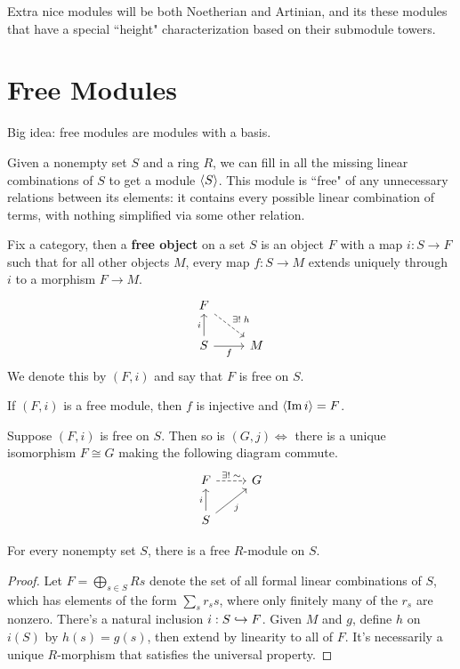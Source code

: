 \documentclass[twoside,10pt]{report}
\begin{document}
Extra nice modules will be both Noetherian and Artinian, and its these modules that have a special ``height" characterization based on their submodule towers.


\section{Free Modules}

\begin{note}[]
Big idea: free modules are modules with a basis.
\end{note}

Given a nonempty set $S$ and a ring $R$, we can fill in all the missing linear combinations of $S$ to get a module $\langle S \rangle$. This module is ``free" of any unnecessary relations between its elements: it contains every possible linear combination of terms, with nothing simplified via some other relation.

\begin{defn}[]
Fix a category, then a \textbf{free object} on a set $S$ is an object $F$ with a map $i:S\to F$ such that for all other objects $M$, every map $f:S\to M$ extends uniquely through $i$ to a morphism $F\to M$.
\[
\begin{tikzcd}
	F \arrow[dr, dashed, "\exists! \; h"] \\
	S \uar{i}\rar["f"'] & M
\end{tikzcd}
\] 
We denote this by $(F, i)$ and say that $F$ is free on $S$.
\end{defn}

\begin{prop}
	If $(F,i)$ is a free module, then $f$ is injective and $\langle \operatorname{Im} i \rangle= F$.
\end{prop}

\begin{thrm}[Uniqueness]
	\label{thrm:free-unique}
	Suppose $(F,i)$ is free on $S$. Then so is $(G,j) \iff$ there is a unique isomorphism $F \cong G$ making the following diagram commute.
	\[
	\begin{tikzcd}
		F \rar[dashed]{\exists!\;\sim} & G \\
		S \uar{i}\arrow[ur,"j"']
	\end{tikzcd}
	\] 
\end{thrm}

\begin{thrm}[Existence]
	For every nonempty set $S$, there is a free $R$-module on $S$.
\end{thrm}
\begin{proof}
	Let $F = \bigoplus_{s \in S}Rs$ denote the set of all formal linear combinations of $S$, which has elements of the form $\sum_s r_s s$, where only finitely many of the $r_s$ are nonzero. There's a natural inclusion $i: S \hookrightarrow F$. Given $M$ and $g$, define $h$ on $i(S)$ by $h(s) = g(s)$, then extend by linearity to all of $F$. It's necessarily a unique $R$-morphism that satisfies the universal property.
\end{proof}
\end{document}
